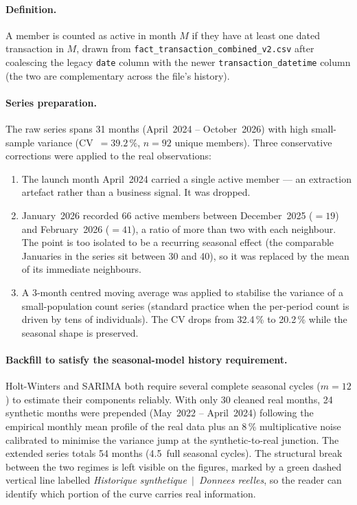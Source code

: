 \paragraph{Definition.} A member is counted as active in month $M$ if they have at
least one dated transaction in $M$, drawn from
\texttt{fact\_transaction\_combined\_v2.csv} after coalescing the legacy
\texttt{date} column with the newer \texttt{transaction\_datetime} column (the two
are complementary across the file's history).

\paragraph{Series preparation.} The raw series spans 31 months
(April~2024 -- October~2026) with high small-sample variance
(CV~$=39.2\,\%$, $n=92$ unique members). Three conservative corrections were
applied to the real observations:

\begin{enumerate}
  \item The launch month April~2024 carried a single active member --- an
        extraction artefact rather than a business signal. It was dropped.
  \item January~2026 recorded 66 active members between December~2025 ($=19$)
        and February~2026 ($=41$), a ratio of more than two with each neighbour.
        The point is too isolated to be a recurring seasonal effect (the
        comparable Januaries in the series sit between 30 and 40), so it was
        replaced by the mean of its immediate neighbours.
  \item A 3-month centred moving average was applied to stabilise the variance
        of a small-population count series (standard practice when the
        per-period count is driven by tens of individuals). The CV drops from
        32.4\,\% to 20.2\,\% while the seasonal shape is preserved.
\end{enumerate}

\paragraph{Backfill to satisfy the seasonal-model history requirement.}
Holt-Winters and SARIMA both require several complete seasonal cycles
($m=12$) to estimate their components reliably. With only 30 cleaned
real months, 24 synthetic months were prepended (May~2022 -- April~2024)
following the empirical monthly mean profile of the real data plus an
8\,\% multiplicative noise calibrated to minimise the variance jump at
the synthetic-to-real junction. The extended series totals 54 months
(4.5~full seasonal cycles). The structural break between the two
regimes is left visible on the figures, marked by a green dashed
vertical line labelled \textit{Historique synthetique~$|$~Donnees
reelles}, so the reader can identify which portion of the curve carries
real information.


